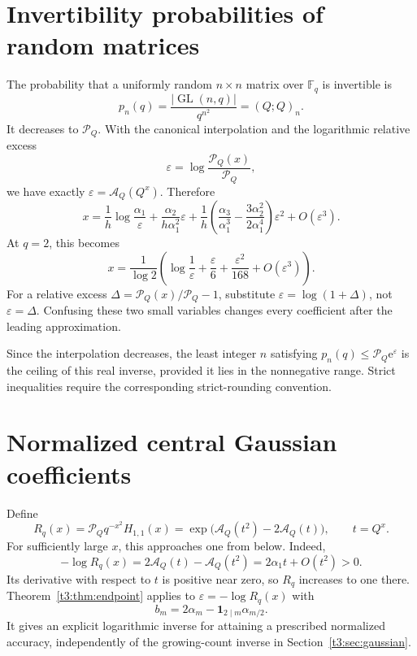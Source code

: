 \documentclass[11pt,openany]{book}
\numberwithin{equation}{chapter}
\theoremstyle{plain}
\theoremstyle{definition}
\theoremstyle{remark}
\newcommand{\ee}{\mathrm e}
\newcommand{\F}{\mathbb F}
\newcommand{\pp}[1]{(Q;Q)_{#1}}
\newcommand{\Pinf}{\mathcal P_Q}
\newcommand{\A}{\mathcal A_Q}
\newcommand{\eps}{\varepsilon}
\newcommand{\one}{\mathbf 1}
\newcommand{\GL}{\operatorname{GL}}\newcommand{\Sp}{\operatorname{Sp}}
\begin{document}
\section{Invertibility probabilities of random matrices}

The probability that a uniformly random $n\times n$ matrix over $\F_q$ is invertible is
\begin{equation}\label{t3:eq:probability}
 p_n(q)=\frac{|\GL(n,q)|}{q^{n^2}}=\pp{n}.
\end{equation}
It decreases to $\Pinf$. With the canonical interpolation and the logarithmic relative excess
\begin{equation}\label{t3:eq:probability-eps}
 \eps=\log\frac{\mathcal P_Q(x)}{\Pinf},
\end{equation}
we have exactly $\eps=\A(Q^x)$. Therefore
\begin{equation}\label{t3:eq:probability-inverse}
 x=\frac1h\log\frac{\alpha_1}{\eps}
 +\frac{\alpha_2}{h\alpha_1^2}\eps
 +\frac1h\left(\frac{\alpha_3}{\alpha_1^3}
       -\frac{3\alpha_2^2}{2\alpha_1^4}\right)\eps^2
 +O(\eps^3).
\end{equation}
At $q=2$, this becomes
\begin{equation}\label{t3:eq:probability-q2}
 x=\frac1{\log2}\left(
       \log\frac1\eps+\frac\eps6+\frac{\eps^2}{168}
       +O(\eps^3)\right).
\end{equation}
For a relative excess $\Delta=\mathcal P_Q(x)/\Pinf-1$, substitute
$\eps=\log(1+\Delta)$, not $\eps=\Delta$. Confusing these two small variables changes every coefficient after the leading approximation.

Since the interpolation decreases, the least integer $n$ satisfying
$p_n(q)\le\Pinf\ee^{\eps}$ is the ceiling of this real inverse, provided it lies in the nonnegative range. Strict inequalities require the corresponding strict-rounding convention.

\section{Normalized central Gaussian coefficients}

Define
\begin{equation}\label{t3:eq:central-normalized}
 R_q(x)=\Pinf q^{-x^2}H_{1,1}(x)
       =\exp\bigl(\A(t^2)-2\A(t)\bigr),\qquad t=Q^x.
\end{equation}
For sufficiently large $x$, this approaches one from below. Indeed,
\[
 -\log R_q(x)=2\A(t)-\A(t^2)=2\alpha_1t+O(t^2)>0.
\]
Its derivative with respect to $t$ is positive near zero, so $R_q$ increases to one there. Theorem~\ref{t3:thm:endpoint} applies to
$\eps=-\log R_q(x)$ with
\begin{equation}\label{t3:eq:central-endpoint-b}
 b_m=2\alpha_m-\one_{2\mid m}\alpha_{m/2}.
\end{equation}
It gives an explicit logarithmic inverse for attaining a prescribed normalized accuracy, independently of the growing-count inverse in Section~\ref{t3:sec:gaussian}.
\end{document}
